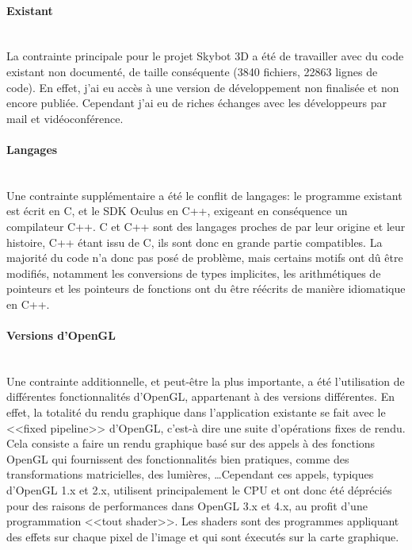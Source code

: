\documentclass[a4paper,french,12pt]{article}
\begin{document}
	    \paragraph{Existant} ~\\
	    
		La contrainte principale pour le projet Skybot 3D a été de travailler avec du code existant non documenté,
		de taille conséquente (3840 fichiers, 22863 lignes de code).
		En effet, j'ai eu accès à une version de développement non finalisée et non encore publiée. Cependant j'ai 
		eu de riches échanges avec les développeurs par mail et vidéoconférence.
		
	    \paragraph{Langages} ~\\
	      
		Une contrainte supplémentaire a été le conflit de langages: le programme existant est écrit en C, et le
		SDK Oculus en C++, exigeant en conséquence un compilateur C++. 
		C et C++ sont des langages proches de par leur origine et leur histoire, C++ étant issu de C, 
		ils sont donc en grande partie compatibles. La majorité du code n'a donc pas posé de problème, 
		mais certains motifs ont dû être modifiés, notamment les conversions de types implicites,
		les arithmétiques de pointeurs et les pointeurs de fonctions ont du être réécrits de manière
		idiomatique en C++.
		
	    \paragraph{Versions d'OpenGL} ~\\
	    
		Une contrainte additionnelle, et peut-être la plus importante, a été l'utilisation de différentes 
		fonctionnalités d'OpenGL, appartenant à des versions différentes.
		En effet, la totalité du rendu graphique dans l'application existante se fait avec le <<fixed pipeline>> 
		d'OpenGL, c'est-à dire une suite d'opérations fixes de rendu. Cela consiste a faire un rendu graphique basé sur des
		appels à des fonctions OpenGL qui fournissent des fonctionnalités bien pratiques, comme des transformations
		matricielles, des lumières, \ldots Cependant ces appels, typiques d'OpenGL 1.x et 2.x, 
		utilisent principalement le CPU et ont donc
		été dépréciés pour des raisons de performances dans OpenGL 3.x et 4.x, au profit d'une programmation
		<<tout shader>>. Les shaders sont des programmes appliquant des effets sur chaque pixel de l'image et qui
		sont éxecutés sur la carte graphique.
		
\end{document}
